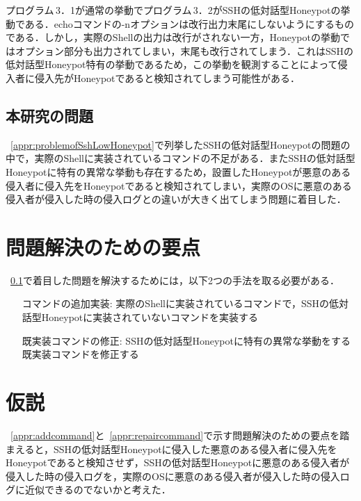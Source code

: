 プログラム\,3．1が通常の挙動でプログラム\,3．2がSSHの低対話型Honeypotの挙動である．echoコマンドの-nオプションは改行出力末尾にしないようにするものである．しかし，実際のShellの出力は改行がされない一方，Honeypotの挙動ではオプション部分も出力されてしまい，末尾も改行されてしまう．これはSSHの低対話型Honeypot特有の挙動であるため，この挙動を観測することによって侵入者に侵入先がHoneypotであると検知されてしまう可能性がある．


\subsection{本研究の問題}
\label{appr:subproblem}
~\ref{appr:problemofSshLowHoneypot}で列挙したSSHの低対話型Honeypotの問題の中で，実際のShellに実装されているコマンドの不足がある．またSSHの低対話型Honeypotに特有の異常な挙動も存在するため，設置したHoneypotが悪意のある侵入者に侵入先をHoneypotであると検知されてしまい，実際のOSに悪意のある侵入者が侵入した時の侵入ログとの違いが大きく出てしまう問題に着目した．

\section{問題解決のための要点}
\label{appr:YotenForProblem}
~\ref{appr:subproblem}で着目した問題を解決するためには，以下2つの手法を取る必要がある．

\begin{itemize}
\setlength{\leftskip}{3.2cm}
 \item[コマンドの追加実装:] 実際のShellに実装されているコマンドで，SSHの低対話型Honeypotに実装されていないコマンドを実装する
 \item[既実装コマンドの修正:] SSHの低対話型Honeypotに特有の異常な挙動をする既実装コマンドを修正する
\end{itemize}


\section{仮説}
\label{appr:Hypothesis}
~\ref{appr:addcommand}と~\ref{appr:repaircommand}で示す問題解決のための要点を踏まえると，SSHの低対話型Honeypotに侵入した悪意のある侵入者に侵入先をHoneypotであると検知させず，SSHの低対話型Honeypotに悪意のある侵入者が侵入した時の侵入ログを，実際のOSに悪意のある侵入者が侵入した時の侵入ログに近似できるのでないかと考えた．

